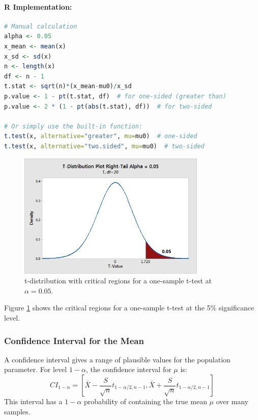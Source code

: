 \documentclass[11pt,a4paper]{article}
\begin{document}
\paragraph{R Implementation:}
\begin{lstlisting}[language=R]
# Manual calculation
alpha <- 0.05
x_mean <- mean(x)
x_sd <- sd(x)
n <- length(x)
df <- n - 1
t.stat <- sqrt(n)*(x_mean-mu0)/x_sd
p.value <- 1 - pt(t.stat, df)  # for one-sided (greater than)
p.value <- 2 * (1 - pt(abs(t.stat), df))  # for two-sided

# Or simply use the built-in function:
t.test(x, alternative="greater", mu=mu0)  # one-sided
t.test(x, alternative="two.sided", mu=mu0)  # two-sided
\end{lstlisting}

\begin{figure}[htb]
    \centering
    \includegraphics[width=0.8\textwidth]{t-test.png}
    \caption{t-distribution with critical regions for a one-sample t-test at $\alpha = 0.05$.}
    \label{fig:t-dist-critical}
\end{figure}

Figure \ref{fig:t-dist-critical} shows the critical regions for a one-sample t-test at the 5\% significance level.

\subsubsection{Confidence Interval for the Mean}

A confidence interval gives a range of plausible values for the population parameter. For level $1-\alpha$, the confidence interval for $\mu$ is:
\begin{equation}
CI_{1-\alpha} = \left[\bar{X} - \frac{S}{\sqrt{n}}t_{1-\alpha/2,n-1}, \bar{X} + \frac{S}{\sqrt{n}}t_{1-\alpha/2,n-1}\right]
\end{equation}
This interval has a $1-\alpha$ probability of containing the true mean $\mu$ over many samples.
\end{document}
